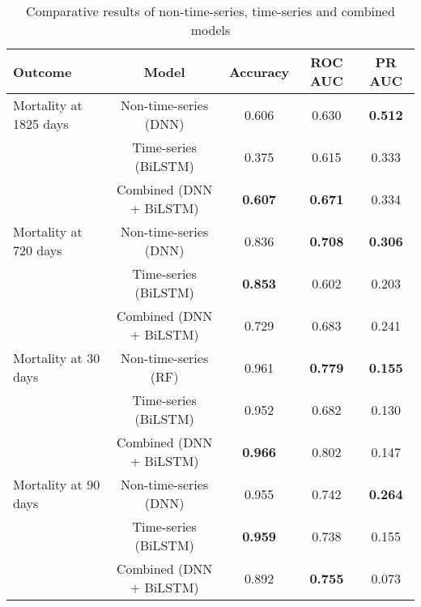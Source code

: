 \documentclass{article}
\begin{document}
\begin{table}[htbp]
    \centering
    \caption{Comparative results of non-time-series, time-series and combined models}
    \begin{tabular}{lcccc}
        \hline
        Outcome                                 & Model                      & Accuracy       & ROC AUC        & PR AUC          \\
        \hline
        Mortality at 1825 days                   & Non-time-series  (DNN)          & 0.606          & 0.630          & \textbf{0.512}          \\
                                                & Time-series       (BiLSTM)         & 0.375          & 0.615          & 0.333          \\
                                                & Combined          (DNN + BiLSTM)         & \textbf{0.607}          & \textbf{0.671}          & 0.334          \\
        \hline
        Mortality at 720 days                   & Non-time-series  (DNN)          & 0.836          & \textbf{0.708}          & \textbf{0.306}          \\
                                                & Time-series       (BiLSTM)         & \textbf{0.853}          & 0.602          & 0.203          \\
                                                & Combined          (DNN + BiLSTM)         & 0.729         & 0.683          & 0.241          \\
        \hline
        Mortality at 30 days                    & Non-time-series  (RF)          & 0.961         & \textbf{0.779}          & \textbf{0.155}          \\
                                                & Time-series       (BiLSTM)         & 0.952          & 0.682          & 0.130          \\
                                                & Combined          (DNN + BiLSTM)         & \textbf{0.966}          & 0.802          & 0.147          \\
        \hline
        Mortality at 90 days                    & Non-time-series  (DNN)          & 0.955          & 0.742          & \textbf{0.264}          \\
                                                & Time-series       (BiLSTM)         & \textbf{0.959}          & 0.738          & 0.155          \\
                                                & Combined          (DNN + BiLSTM)         & 0.892          & \textbf{0.755}          & 0.073          \\

\end{tabular}
\end{table}
\end{document}
